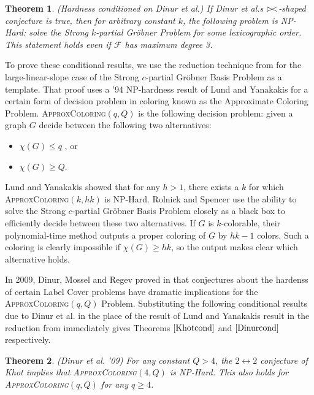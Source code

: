 \documentclass{article}
\newtheorem{theorem}{Theorem}[]
\newcommand{\mytie}{\mathrel{\rhd\mspace{-9mu}<}}
\begin{document}
\begin{theorem} \label{Dinurcond}(Hardness conditioned on Dinur et al.)
If Dinur et al.s $\mytie$-shaped conjecture is true, then for arbitrary constant $k$, the following problem is NP-Hard:
solve the Strong $k$-partial Gr\"{o}bner Problem for some lexicographic order.
This statement holds even if $\mathcal{F}$ has maximum degree 3.
\end{theorem}

To prove these conditional results, we use the reduction technique from \citep{RS} for the large-linear-slope case of the Strong $c$-partial Gr\"{o}bner Basis Problem as a template. That proof uses a '94 NP-hardness result of Lund and Yanakakis \citep{Lundyan} for a certain form of decision problem in coloring known as the Approximate Coloring Problem. 
\textsc{ApproxColoring}$(q,Q)$ is the following decision problem: given a graph $G$ decide between the following two alternatives:
\begin{itemize}
\item $\chi (G)\leq q$ , or
\item $\chi (G)\geq Q$.
\end{itemize}

Lund and Yanakakis showed that for any $h>1$, there exists a $k$ for which \textsc{ApproxColoring}$(k,hk)$ is NP-Hard.  Rolnick and Spencer use the ability to solve the Strong $c$-partial Gr\"{o}bner Basis Problem closely as a black box to efficiently decide between these two alternatives. If $G$ is $k$-colorable, their polynomial-time method outputs a proper coloring of $G$ by $hk-1$ colors. Such a coloring is clearly impossible if $\chi (G)\geq hk$, so the output makes clear which alternative holds.



In 2009, Dinur, Mossel and Regev proved in \citep{dinur} that conjectures about the hardenss of certain Label Cover problems have dramatic implications for the \textsc{ApproxColoring}$(q,Q)$ Problem. Substituting the following conditional results due to Dinur et al. in the place of the result of Lund and Yanakakis result in the reduction from \citep{RS} immediately gives Theorems $\ref{Khotcond}$ and $\ref{Dinurcond}$ respectively.

\begin{theorem} (Dinur et al. '09)
For any constant $Q>4$, the $2\leftrightarrow 2$ conjecture of Khot implies that \textsc{ApproxColoring}$(4,Q)$ is NP-Hard. This also holds for \textsc{ApproxColoring}$(q,Q)$ for any $q\geq 4$.
\end{theorem}
\end{document}
